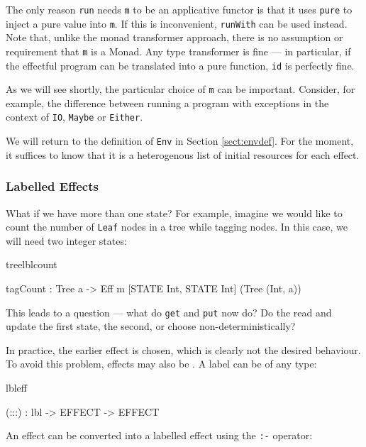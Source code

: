 The only reason \texttt{run} needs \texttt{m} to be an applicative functor
is that it uses \texttt{pure} to inject a pure value into \texttt{m}. If this
is inconvenient, \texttt{runWith} can be used instead. Note that, unlike the
monad transformer approach, there is no assumption or requirement that
\texttt{m} is a Monad. Any type transformer is fine --- in particular,
if the effectful program can be translated into a pure function, \texttt{id}
is perfectly fine.

As we will see shortly, the particular choice of \texttt{m} can be
important. Consider, for example, the difference between running a program with
exceptions in the context of \texttt{IO}, \texttt{Maybe} or \texttt{Either}.

We will return to the definition of \texttt{Env} in Section \ref{sect:envdef}.
For the moment, it suffices to know that it is a heterogenous list of initial
resources for each effect.

\subsubsection{Labelled Effects}

What if we have more than one state? For example, imagine we would like to
count the number of \texttt{Leaf} nodes in a tree while tagging nodes.
In this case, we will need two integer states:

\begin{SaveVerbatim}{treelblcount}

tagCount : Tree a -> 
     Eff m [STATE Int, STATE Int] (Tree (Int, a))

\end{SaveVerbatim}

This leads to a question --- what do \texttt{get} and \texttt{put} now do?  Do
the read and update the first state, the second, or choose
non-deterministically? 

In practice, the earlier effect is chosen, which is clearly not the desired
behaviour.  To avoid this problem, effects may also be .
A label can be of any type:

\begin{SaveVerbatim}{lbleff}

(:::) : lbl -> EFFECT -> EFFECT

\end{SaveVerbatim}

\noindent
An effect can be converted into a labelled effect using the \texttt{:-}
operator:

